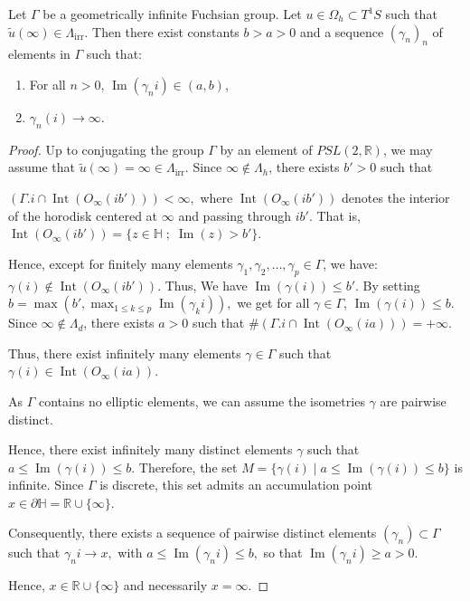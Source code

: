 \documentclass[10pt,a4paper]{amsart}
\begin{document}
\begin{lem}\label{A}
Let \( \Gamma \) be a geometrically infinite Fuchsian group.  
Let \( u \in \Omega_h \subset T^1S \) such that \( \widetilde{u}(\infty) \in \Lambda_{\mathrm{irr}} \).  
Then there exist constants \( b > a > 0 \) and a sequence \( (\gamma_n)_n \) of elements in \( \Gamma \) such that:
\begin{enumerate}
    \item For all \( n > 0 \), \( \operatorname{Im}(\gamma_n i) \in (a, b) \),
    \item \( \gamma_n(i) \to \infty \).
\end{enumerate}
\end{lem}

\begin{proof}
Up to conjugating the group \( \Gamma \) by an element of \( PSL(2, \mathbb{R}) \), we may assume that \( \widetilde{u}(\infty) = \infty \in \Lambda_{\mathrm{irr}} \). Since \( \infty \notin \Lambda_h \), there exists \( b' > 0 \) such that

$\left( \Gamma.i \cap \operatorname{Int}(O_{\infty}(ib')) \right) < \infty,$
where \( \operatorname{Int}(O_{\infty}(ib')) \) denotes the interior of the horodisk centered at \( \infty \) and passing through \( ib' \).  
That is, \( \operatorname{Int}(O_{\infty}(ib')) = \{ z \in \mathbb{H} \; ; \; \operatorname{Im}(z) > b' \} \).

Hence, except for finitely many elements \( \gamma_1, \gamma_2, \ldots, \gamma_p \in \Gamma \), we have:
$
\gamma(i) \notin \operatorname{Int}(O_{\infty}(ib')).
$
Thus, We have $\operatorname{Im}(\gamma(i)) \leq b' $. By setting 
$
b = \max \left( b', \max_{1 \leq k \leq p} \operatorname{Im}(\gamma_k i) \right),
$
we get for all \( \gamma \in \Gamma \),
$
\operatorname{Im}(\gamma(i)) \leq b.
$
Since \( \infty \notin \Lambda_d \), there exists \( a > 0 \) such that 
$
\# \left( \Gamma.i \cap \operatorname{Int}(O_{\infty}(i a)) \right) = +\infty.
$

Thus, there exist infinitely many elements \( \gamma \in \Gamma \) such that
$
\gamma(i) \in \operatorname{Int}(O_{\infty}(i a)).
$

As \( \Gamma \) contains no elliptic elements, we can assume the isometries \( \gamma \) are pairwise distinct.

Hence, there exist infinitely many distinct elements \( \gamma \) such that
$
a \leq \operatorname{Im}(\gamma(i)) \leq b.
$
Therefore, the set 
$
M = \{ \gamma(i) \mid a \leq \operatorname{Im}(\gamma(i)) \leq b \}
$
is infinite. Since \( \Gamma \) is discrete, this set admits an accumulation point
$
x \in \partial \mathbb{H} = \mathbb{R} \cup \{\infty\}.
$

Consequently, there exists a sequence of pairwise distinct elements \( (\gamma_n) \subset \Gamma \) such that
$
\gamma_n i \to x,
$
with
$
a \leq \operatorname{Im}(\gamma_n i) \leq b,
$
so that
$
\operatorname{Im}(\gamma_n i) \geq a > 0.
$

Hence, \( x \in \mathbb{R} \cup \{\infty\} \) and necessarily
$
x = \infty.
$
\end{proof}
\end{document}
